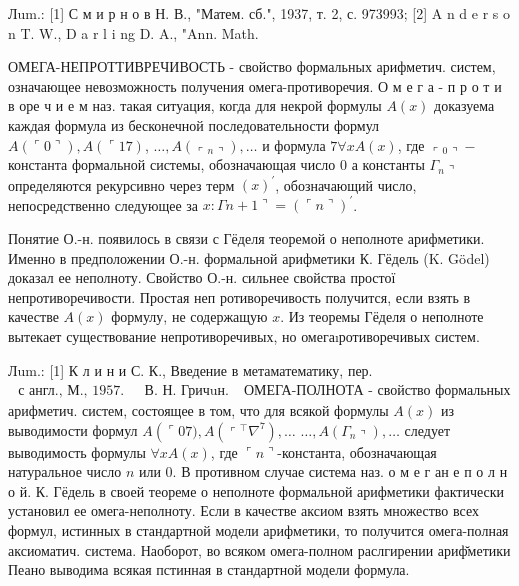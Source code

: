 \documentclass[10pt]{article}
\begin{document}
Лum.: [1] С м и р н о в Н. В., "Матем. сб.", 1937, т. 2, с. 973993; [2] A n d e r s o n T. W., D a r l i ng D. A., "Ann. Math.



ОМЕГА-НЕПРОТТИВРЕЧИВОСТЬ - свойство формальных арифметич. систем, означающее невозможность получения омега-противоречия. О м е г а - п р о т и в оре ч и е м наз. такая ситуация, когда для некрой формулы $A(x)$ доказуема каждая формула из бесконечной последовательности формул $A(\ulcorner 0\urcorner), A(\ulcorner 17)$, $\ldots, A\left(\left\ulcorner_{n}\right\urcorner\right), \ldots$ и формула $7 \forall x A(x)$, где $\left\ulcorner_{0}\right\urcorner-$ константа формальной системы, обозначающая число 0 а константы $\left.\Gamma_{n}\right\urcorner$ определяются рекурсивно через терм $(x)^{\prime}$, обозначающий число, непосредственно следующее за $x: \Gamma n+1\urcorner=(\ulcorner n\urcorner)^{\prime}$.



Понятие О.-н. появилось в связи с Гёделя теоремой о неполноте арифметики. Именно в предположении О.-н. формальной арифметики К. Гёдель (K. Gödel) доказал ее неполноту. Свойство О.-н. сильнее свойства простої непротиворечивости. Простая неп ротиворечивость получится, если взять в качестве $A(x)$ формулу, не содержащую $x$. Из теоремы Гёделя о неполноте вытекает существование непротиворечивых, но омегаıротиворечивых систем.



Лum.: [1] К л и н и С. К., Введение в метаматематику, пер. $\begin{array}{ll}\text { с англ., М., 1957. } & \text { В. Н. Гричuн. }\end{array}$ ОМЕГА-ПОЛНОТА - свойство формальных арифметич. систем, состоящее в том, что для всякой формулы $A(x)$ из выводимости формул $A\left(\ulcorner 07), A\left(\left\ulcorner^{\top} \nabla^{7}\right), \ldots\right.\right.$ $\left.\ldots, A\left(\Gamma_{n}\right\urcorner\right), \ldots$ следует выводимость формулы $\forall x A(x)$, где $\ulcorner n\urcorner$-константа, обозначающая натуральное число $n$ или 0. В противном случае система наз. о м е г ан е п о л н о й. К. Гёдель в своей теореме о неполноте формальной арифметики фактически установил ее омега-неполноту. Если в качестве аксиом взять множество всех формул, истинных в стандартной модели арифметики, то получится омега-полная аксиоматич. система. Наоборот, во всяком омега-полном раслгирении ариф̆метики Пеано выводима всякая пстинная в стандартной модели формула.
\end{document}
